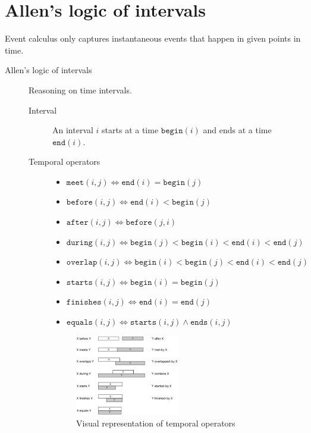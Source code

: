 \section{Allen's logic of intervals}

Event calculus only captures instantaneous events that happen in given points in time.

\begin{description}
    \item[Allen's logic of intervals] 
        Reasoning on time intervals.

        \begin{description}
            \item[Interval]  
                An interval $i$ starts at a time $\texttt{begin}(i)$ and ends at a time $\texttt{end}(i)$.

            \item[Temporal operators] 
                \begin{itemize}
                    \item $\texttt{meet}(i, j) \iff \texttt{end}(i) = \texttt{begin}(j)$
                    \item $\texttt{before}(i, j) \iff \texttt{end}(i) < \texttt{begin}(j)$
                    \item $\texttt{after}(i, j) \iff \texttt{before}(j, i)$
                    \item $\texttt{during}(i, j) \iff \texttt{begin}(j) < \texttt{begin}(i) < \texttt{end}(i) < \texttt{end}(j)$
                    \item $\texttt{overlap}(i, j) \iff \texttt{begin}(i) < \texttt{begin}(j) < \texttt{end}(i) < \texttt{end}(j)$
                    \item $\texttt{starts}(i, j) \iff \texttt{begin}(i) = \texttt{begin}(j)$
                    \item $\texttt{finishes}(i, j) \iff \texttt{end}(i) = \texttt{end}(j)$
                    \item $\texttt{equals}(i, j) \iff \texttt{starts}(i, j) \land \texttt{ends}(i, j)$
                \end{itemize}

                \begin{figure}[H]
                    \centering
                    \includegraphics[width=0.5\textwidth]{img/allen_intervals.png}
                    \caption{Visual representation of temporal operators}
                \end{figure}
        \end{description}
\end{description}